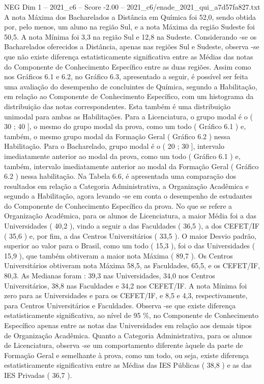 \begin{textsample}{NEG Dim 1 – 2021\_c6 – Score -2.00 – 2021\_c6/enade\_2021\_qui\_a7d57fa827.txt}
A nota Máxima dos Bacharelados a Distância em Química foi 52,0, sendo obtida por, pelo menos, um aluno na região Sul, e a nota Máxima da região Sudeste foi 50,5.
A nota Mínima foi 3,3 na região Sul e 12,8 na Sudeste.
Considerando -se os Bacharelados oferecidos a Distância, apenas nas regiões Sul e Sudeste, observa -se que não existe diferença estatisticamente significativa entre as Médias das notas do Componente de Conhecimento Específico entre as duas regiões.
Assim como nos Gráficos 6.1 e 6.2, no Gráfico 6.3, apresentado a seguir, é possível ser feita uma avaliação do desempenho de concluintes de Química, segundo a Habilitação, em relação ao Componente de Conhecimento Específico, com um histograma da distribuição das notas correspondentes.
Esta também é uma distribuição unimodal para ambas as Habilitações.
Para a Licenciatura, o grupo modal é o ( 30 ; 40 ], o mesmo do grupo modal da prova, como um todo ( Gráfico 6.1 ) e, também, o mesmo grupo modal da Formação Geral ( Gráfico 6.2 ) nessa Habilitação.
Para o Bacharelado, grupo modal é o ( 20 ; 30 ], intervalo imediatamente anterior ao modal da prova, como um todo ( Gráfico 6.1 ) e, também, intervalo imediatamente anterior ao modal da Formação Geral ( Gráfico 6.2 ) nessa habilitação.
Na Tabela 6.6, é apresentada uma comparação dos resultados em relação a Categoria Administrativa, a Organização Acadêmica e segundo a Habilitação, agora levando -se em conta o desempenho de estudantes do Componente de Conhecimento Específico da prova.
No que se refere a Organização Acadêmica, para os alunos de Licenciatura, a maior Média foi a das Universidades ( 40,2 ), vindo a seguir a das Faculdades ( 36,5 ), a dos CEFET/IF ( 35,6 ) e, por fim, a das Centros Universitários ( 33,5 ).
O maior Desvio padrão, superior ao valor para o Brasil, como um todo ( 15,3 ), foi o das Universidades ( 15,9 ), que também obtiveram a maior nota Máxima ( 89,7 ).
Os Centros Universitários obtiveram nota Máxima 58,5, as Faculdades, 65,5, e os CEFET/IF, 80,3.
As Medianas foram : 39,3 nas Universidades, 34,0 nos Centros Universitários, 38,8 nas Faculdades e 34,2 nos CEFET/IF.
A nota Mínima foi zero para as Universidades e para os CEFET/IF, e 8,5 e 4,3, respectivamente, para Centros Universitários e Faculdades.
Observa -se que existe diferença estatisticamente significativa, ao nível de 95 \%, no Componente de Conhecimento Específico apenas entre as notas das Universidades em relação aos demais tipos de Organização Acadêmica.
Quanto a Categoria Administrativa, para os alunos de Licenciatura, observa -se um comportamento diferente àquele da parte de Formação Geral e semelhante à prova, como um todo, ou seja, existe diferença estatisticamente significativa entre as Médias das IES Públicas ( 38,8 ) e as das IES Privadas ( 36,7 ).

\end{textsample}
